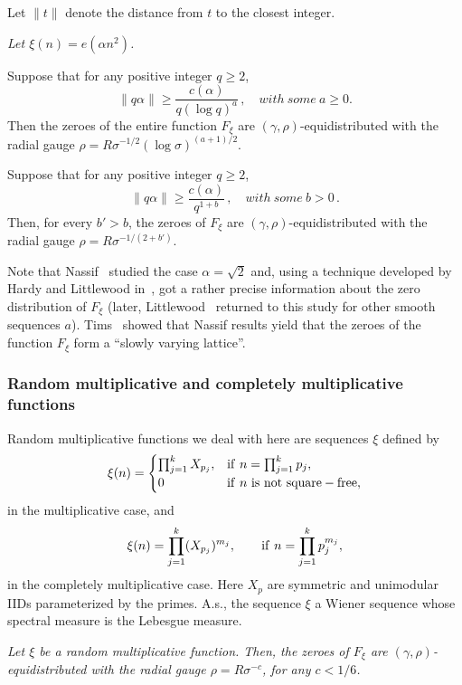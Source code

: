 \documentclass[11pt]{amsart}
\numberwithin{equation}{section}
\begin{document}
Let $\| t \|$ denote the distance from $t$ to the closest integer.

\medskip{}
{\em
Let $\xi (n) = e(\alpha n^2)$.

\smallskip{} Suppose that for any positive integer $q\ge 2$,
\[
\| q\alpha \| \ge \frac{c(\alpha)}{q(\log q)^a}\,, \quad with\ some\ a\ge 0.
\]
Then the zeroes of the entire function $F_\xi$ are $(\gamma, \rho)$-equidistributed 
with the radial gauge $\rho=R\sigma^{-1/2}(\log\sigma)^{(a+1)/2}$.

\smallskip{} Suppose that for any positive integer $q\ge 2$,
\[
\| q\alpha \| \ge \frac{c(\alpha)}{q^{1+b}}\,, \quad with\ some\ b>0\,.
\]
Then, for every $b'>b$, the zeroes of $F_\xi$ are $(\gamma, \rho)$-equidistributed 
with the radial gauge $\rho=R\sigma^{-1/(2+b')}$.
}\medskip

 
Note that Nassif~\cite{Nassif} studied the case $\alpha=\sqrt{2}$
and, using a technique developed by Hardy and Littlewood in~\cite{HL},
got a rather precise information about the zero distribution of $F_\xi$
(later, Littlewood~\cite{Littlewood, Littlewood2} returned to this study for other
smooth sequences $a$). Tims~\cite{Tims}
showed that Nassif results yield that the zeroes of
the function $F_\xi$ form a ``slowly varying lattice''.

\subsubsection{Random multiplicative and completely multiplicative functions}
Random multiplicative functions we deal with here are sequences $\xi$  defined
by
\[
\xi(n) =
\begin{cases}
\prod_{j=1}^k X_{p_j}, &{\rm if\ } n=\prod_{j=1}^k p_j, \\
0 &{\rm if\ } n {\rm\  is\ not\ square-free},
\end{cases}
\]
in the multiplicative case, and
\[
\xi(n) = \prod_{j=1}^k (X_{p_j})^{m_j}, \qquad {\rm if\ } n = \prod_{j=1}^k p_j^{m_j},
\]
in the completely multiplicative case. Here $X_p$ are symmetric and unimodular IIDs parameterized by the primes. A.s., the sequence $\xi$ a Wiener sequence whose spectral measure is the Lebesgue measure.

\medskip{}
{\em Let $\xi$ be a random multiplicative function. Then, the zeroes of $F_\xi$ are 
$(\gamma, \rho)$-equidistributed with the radial gauge $\rho=R\sigma^{-c}$, for any $c<1/6$.
}\medskip
\end{document}
